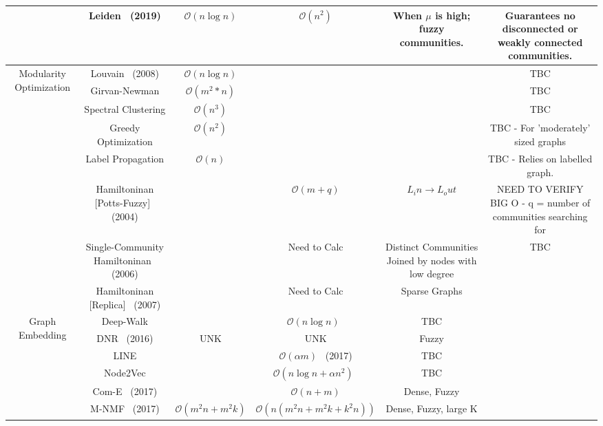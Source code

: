 \begin{landscape}
\begin{table}[t]
\begin{tabular}{|c|c|c|c|c|c|}
                                                  & Leiden~\cite{Traag2019} (2019)        & $\mathcal{O}(n\log{n})$   & $\mathcal{O}(n^2)$ & When $\mu$ is high; fuzzy communities.  & Guarantees no disconnected or weakly connected communities.  \\
        \hline
        \multirow{8}{*}{Modularity Optimization}  & Louvain~\cite{Blondel2008} (2008)     & $\mathcal{O}(n\log{n})$   & & & TBC \\
                                                  & Girvan-Newman                         & $\mathcal{O}(m^2*n)$      & & & TBC \\
                                                  & Spectral Clustering                   & $\mathcal{O}(n^3)$        & & & TBC \\
                                                  & Greedy Optimization                   & $\mathcal{O}(n^2)$        & & & TBC - For 'moderately' sized graphs \\
                                                  & Label Propagation                     & $\mathcal{O}(n)$         &  & & TBC - Relies on labelled graph.\\
                                                  & Hamiltoninan [Potts-Fuzzy]~\cite{Reichardt2004} (2004) & & $\mathcal{O}(m+q)$& $L_in\rightarrow L_out$ & NEED TO VERIFY BIG O - q = number of communities searching for \\
                                                  & Single-Community Hamiltoninan~\cite{Reichardt2006} (2006)   & &  Need to Calc    & Distinct Communities Joined by nodes with low degree & TBC \\
                                                  & Hamiltoninan [Replica]~\cite{Reichardt2007} (2007)    & &  Need to Calc   & Sparse Graphs \\
        \hline
        \multirow{5}{*}{Graph Embedding}  & Deep-Walk                   &   & $\mathcal{O}(n\log{n})$~\cite{Cavallari2017}  & TBC \\
                                          & DNR~\cite{Yang2016} (2016)  & UNK  & UNK  & Fuzzy \\
                                          & LINE                        &   & $\mathcal{O}(\alpha m)$~\cite{Cavallari2017} (2017) & TBC \\
                                          & Node2Vec                    &   & $\mathcal{O}(n\log{n}+\alpha n^2)$~\cite{Cavallari2017} & TBC \\
                                          & Com-E~\cite{Cavallari2017} (2017)  &   & $\mathcal{O}(n + m)$ & Dense, Fuzzy \\
                                          & M-NMF~\cite{Wang2017} (2017)  & $\mathcal{O}(m^2n + m^2k)$  & $\mathcal{O}(n(m^2n + m^2k + k^2n))$ & Dense, Fuzzy, large K \\
        \hline

      

      \end{tabular} 
    \end{table}
  \normalsize
  \end{landscape}
